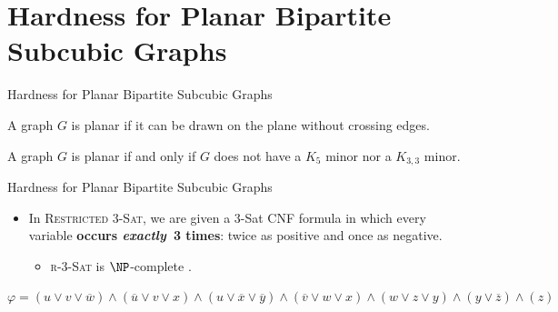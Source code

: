 \documentclass[10pt,aspectratio=169,english]{beamer}
\newtheorem{proposition}{Proposition}
\begin{document}
\part{Hardness for Planar Bipartite Subcubic Graphs}


\begin{frame}{Hardness for Planar Bipartite Subcubic Graphs}
	\begin{definition}
		A graph $G$ is planar if it can be drawn on the plane without crossing edges.
	\end{definition}
	
	\begin{theorem}
		A graph $G$ is planar if and only if $G$ does not have a $K_5$ minor nor a $K_{3,3}$ minor.
	\end{theorem}
\end{frame}

\begin{frame}{Hardness for Planar Bipartite Subcubic Graphs}
	\begin{itemize}
		\item In \textsc{Restricted 3-Sat}, we are given a 3-Sat CNF formula in which every variable \textbf{occurs \textit{exactly}~3 times}: twice as positive and once as negative.
		\begin{itemize}
			\item \textsc{r-3-Sat} is $\NP$-complete \parencite{Dahlhaus1994}.
		\end{itemize}
	\end{itemize}
	
	\begin{example}
		$
			\label{eq:formula_phi}
			\varphi = (u \lor v \lor \overline{w}) \land (\overline{u} \lor v \lor x) \land (u \lor \overline{x} \lor \overline{y}) \land (\overline{v} \lor w \lor x) \land (w \lor z \lor y) \land (y \lor \overline{z}) \land (z)
		$
	\end{example}
	
	
\end{frame}
\end{document}

